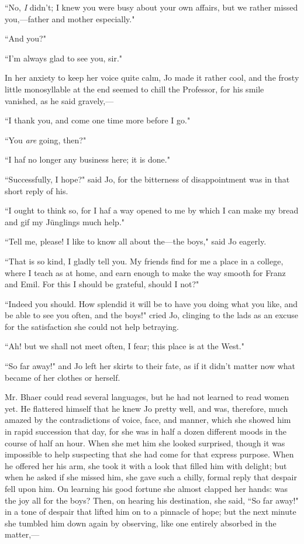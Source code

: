 ``No, \emph{I} didn't; I knew you were busy about your
own affairs, but we rather missed you,---father and mother especially."

``And you?"

``I'm always glad to see you, sir."

In her anxiety to keep her voice quite calm, Jo made it rather cool, and
the frosty little monosyllable at the end seemed to chill the Professor,
for his smile vanished, as he said gravely,---

``I thank you, and come one time more before I go."

``You \emph{are} going, then?"

``I haf no longer any business here; it is done."

``Successfully, I hope?" said Jo, for the bitterness of disappointment
was in that short reply of his.

``I ought to think so, for I haf a way opened to me by which I can make
my bread and gif my Jünglings much help."

``Tell me, please! I like to know all about the---the boys," said Jo
eagerly.

``That is so kind, I gladly tell you. My friends find for me a place in a
college, where I teach as at home, and earn enough to make the way
smooth for Franz and Emil. For this I should be grateful, should I not?"

``Indeed you should. How splendid it will be to have you doing what you
like, and be able to see you often, and the boys!" cried Jo, clinging to
the lads as an excuse for the satisfaction she could not help betraying.

``Ah! but we shall not meet often, I fear; this place is at the West."

``So far away!" and Jo left her skirts to their fate, as if it
didn't matter now what became of her clothes or herself.

Mr. Bhaer could read several languages, but he had not learned to read
women yet. He flattered himself that he knew Jo pretty well, and was,
therefore, much amazed by the contradictions of voice, face, and manner,
which she showed him in rapid succession that day, for she was in half a
dozen different moods in the course of half an hour. When she met him
she looked surprised, though it was impossible to help suspecting that
she had come for that express purpose. When he offered her his arm, she
took it with a look that filled him with delight; but when he asked if
she missed him, she gave such a chilly, formal reply that despair fell
upon him. On learning his good fortune she almost clapped her hands: was
the joy all for the boys? Then, on hearing his destination, she said,
``So far away!" in a tone of despair that lifted him on to a pinnacle of
hope; but the next minute she tumbled him down again by observing, like
one entirely absorbed in the matter,---

